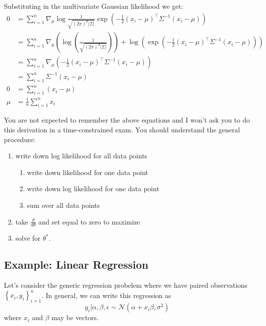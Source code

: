 \documentclass[
  letterpaper,
  DIV=11,
  numbers=noendperiod]{scrreprt}
\providecommand{\tightlist}{%
  \setlength{\itemsep}{0pt}\setlength{\parskip}{0pt}}
\begin{document}
Substituting in the multivariate Gaussian likelihood we get: \[
\begin{aligned}
0 & =\sum_{i=1}^n \nabla_\mu \log \frac{1}{\sqrt{(2 \pi)^d|\Sigma|}} \exp \left(-\frac{1}{2}\left(x_i-\mu\right)^{\top} \Sigma^{-1}\left(x_i-\mu\right)\right) \\
& =\sum_{i=1}^n \nabla_\mu\left(\log \left(\frac{1}{\sqrt{(2 \pi)^d|\Sigma|}}\right)\right)+\log \left(\exp \left(-\frac{1}{2}\left(x_i-\mu\right)^{\top} \Sigma^{-1}\left(x_i-\mu\right)\right)\right) \\
& =\sum_{i=1}^n \nabla_\mu\left(-\frac{1}{2}\left(x_i-\mu\right)^{\top} \Sigma^{-1}\left(x_i-\mu\right)\right)\\
&=\sum_{i=1}^n \Sigma^{-1}\left(x_i-\mu\right) \\
0 &= \sum_{i=1}^n (x_i - \mu) \\
\mu &= \frac{1}{n} \sum_{i=1}^n x_i
\end{aligned}
\]

You are not expected to remember the above equations and I won't ask you
to do this derivation in a time-constrained exam. You should understand
the general procedure:

\begin{enumerate}
\def\labelenumi{\arabic{enumi}.}
\tightlist
\item
  write down log likelihood for all data points

  \begin{enumerate}
  \def\labelenumii{\arabic{enumii}.}
  \tightlist
  \item
    write down likelihood for one data point
  \item
    write down log likelihood for one data point
  \item
    sum over all data points
  \end{enumerate}
\item
  take \(\frac{d}{d\theta}\) and set equal to zero to maximize
\item
  solve for \(\theta^*\).
\end{enumerate}

\subsection{Example: Linear Regression}\label{example-linear-regression}

Let's consider the generic regression probelem where we have paired
observations \(\left\{x_i, y_i\right\}_{i=1}^n\). In general, we can
write this regression as \[
y_i | \alpha, \beta, \epsilon \sim \mathcal{N}(\alpha + x_i \beta, \sigma^2)
\] where \(x_i\) and \(\beta\) may be vectors.
\end{document}
